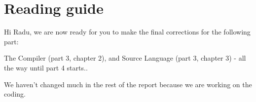 \section{Reading guide}
Hi Radu, we are now ready for you to make the final corrections for the following part:

The Compiler (part 3, chapter 2), and Source Language (part 3, chapter 3) - all the way until part 4 starts..

We haven't changed much in the rest of the report because we are working on the coding.